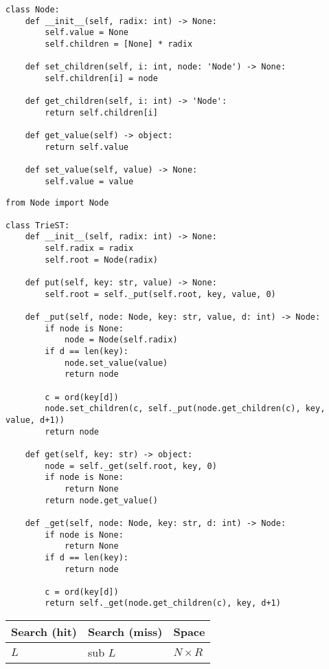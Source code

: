 \documentclass[a4paper]{article}
\begin{document}
\begin{lstlisting}
class Node:
    def __init__(self, radix: int) -> None:
        self.value = None
        self.children = [None] * radix

    def set_children(self, i: int, node: 'Node') -> None:
        self.children[i] = node

    def get_children(self, i: int) -> 'Node':
        return self.children[i]

    def get_value(self) -> object:
        return self.value

    def set_value(self, value) -> None:
        self.value = value
\end{lstlisting}

\begin{lstlisting}
from Node import Node

class TrieST:
    def __init__(self, radix: int) -> None:
        self.radix = radix
        self.root = Node(radix)

    def put(self, key: str, value) -> None:
        self.root = self._put(self.root, key, value, 0)

    def _put(self, node: Node, key: str, value, d: int) -> Node:
        if node is None:
            node = Node(self.radix)
        if d == len(key):
            node.set_value(value)
            return node

        c = ord(key[d])
        node.set_children(c, self._put(node.get_children(c), key, value, d+1))
        return node

    def get(self, key: str) -> object:
        node = self._get(self.root, key, 0)
        if node is None:
            return None
        return node.get_value()

    def _get(self, node: Node, key: str, d: int) -> Node:
        if node is None:
            return None
        if d == len(key):
            return node

        c = ord(key[d])
        return self._get(node.get_children(c), key, d+1)
\end{lstlisting}

\begin{spacing}{1.5}
\begin{tabularx}{1\textwidth}{|X|X|X|}
    \hline
    \textbf{Search (hit)} & \textbf{Search (miss)} & \textbf{Space}\\
    \hline
    $L$&sub $L$&$N\times R$\\
    \hline
\end{tabularx}
\end{spacing}
\end{document}

